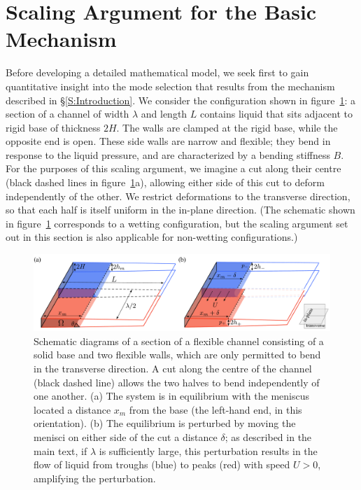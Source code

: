 \documentclass{jfm}
\begin{document}
\section{Scaling Argument for the Basic Mechanism}\label{S:Scaling}
Before developing a detailed mathematical model, we seek first to gain quantitative insight into the mode selection that results from the mechanism described in \S\ref{S:Introduction}. We consider the configuration shown in figure~\ref{fig:Scaling:ScalingArgument}: a section of a channel of width $\lambda$ and length $L$ contains liquid that sits adjacent to rigid base of thickness $2H$. The walls are clamped at the rigid base, while the opposite end is open. These side walls are narrow and flexible; they bend in response to the liquid pressure, and are characterized by a bending stiffness $B$. For the purposes of this scaling argument, we imagine a cut along their centre (black dashed lines in figure~\ref{fig:Scaling:ScalingArgument}a), allowing either side of this cut to deform independently of the other. We restrict deformations to the transverse direction, so that each half is itself uniform in the in-plane direction. (The schematic shown in figure~\ref{fig:Scaling:ScalingArgument} corresponds to a wetting configuration, but the scaling argument set out in this section is also applicable for non-wetting configurations.)

\begin{figure}
\centering
\includegraphics[width = .99\textwidth]{figures/fig3_scaling_argument.pdf}
\caption{Schematic diagrams of a section of a flexible channel consisting of a solid base and two flexible walls, which are only permitted to bend in the transverse direction. A cut along the centre of the channel (black dashed line) allows the two halves to bend independently of one another. (a) The system is in equilibrium with the meniscus located a distance $x_m$ from the base (the left-hand end, in this orientation).  (b) The equilibrium is perturbed by moving the menisci on either side of the cut a distance $\delta$; as described in the main text, if $\lambda$ is sufficiently large, this perturbation results in the flow of liquid from troughs (blue) to peaks (red) with speed $U > 0$, amplifying the perturbation.}
\label{fig:Scaling:ScalingArgument}
\end{figure}
\end{document}
